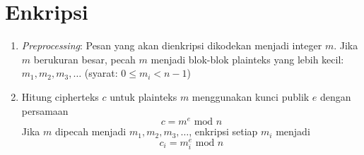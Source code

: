 \documentclass{article}
\begin{document}

\section*{Enkripsi}

\begin{enumerate}
    \item \textit{Preprocessing}: Pesan yang akan dienkripsi dikodekan menjadi integer $m$. Jika $m$ berukuran besar, pecah $m$ menjadi blok-blok plainteks yang lebih kecil: $m_1, m_2, m_3, \dots$ (syarat: $0 \le m_i < n - 1$)
    \item Hitung cipherteks $c$ untuk plainteks $m$ menggunakan kunci publik $e$ dengan persamaan
    \[ c = m^e \text{ mod } n \]
    Jika $m$ dipecah menjadi $m_1, m_2, m_3, \dots$, enkripsi setiap $m_i$ menjadi
    \[ c_i = m_i^e \text{ mod } n \]
\end{enumerate}
\end{document}
